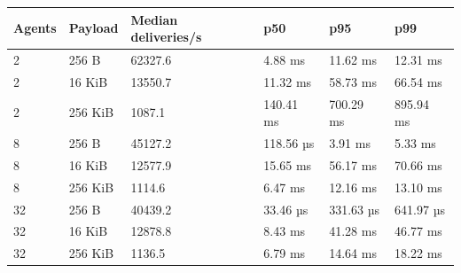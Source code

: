 \begin{tabular}{llllll}
\hline
Agents & Payload & Median deliveries/s & p50 & p95 & p99 \\
\hline
2 & 256 B & 62327.6 & 4.88 ms & 11.62 ms & 12.31 ms \\
2 & 16 KiB & 13550.7 & 11.32 ms & 58.73 ms & 66.54 ms \\
2 & 256 KiB & 1087.1 & 140.41 ms & 700.29 ms & 895.94 ms \\
8 & 256 B & 45127.2 & 118.56 µs & 3.91 ms & 5.33 ms \\
8 & 16 KiB & 12577.9 & 15.65 ms & 56.17 ms & 70.66 ms \\
8 & 256 KiB & 1114.6 & 6.47 ms & 12.16 ms & 13.10 ms \\
32 & 256 B & 40439.2 & 33.46 µs & 331.63 µs & 641.97 µs \\
32 & 16 KiB & 12878.8 & 8.43 ms & 41.28 ms & 46.77 ms \\
32 & 256 KiB & 1136.5 & 6.79 ms & 14.64 ms & 18.22 ms \\
\hline
\end{tabular}
